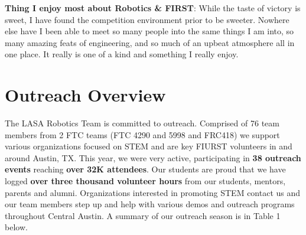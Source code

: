 {\bf Thing I enjoy most about Robotics \& FIRST}: While the taste of victory is sweet, I have found the competition environment prior to be sweeter. Nowhere else have I been able to meet so many people into the same things I am into, so many amazing feats of engineering, and so much of an upbeat atmosphere all in one place. It really is one of a kind and something I really enjoy. 

\clearpage
\newpage

\section{Outreach Overview}
The LASA Robotics Team is committed to outreach.  Comprised of 76 team members from 2 FTC teams (FTC 4290 and 5998 and FRC418) we support various organizations focused on STEM and are key FIURST volunteers in and around Austin, TX.  This year, we were very active, participating in {\bf 38 outreach events} reaching {\bf over 32K attendees}.  Our students are proud that we have logged {\bf over three thousand volunteer hours} from our students, mentors, parents and alumni.   Organizations interested in promoting STEM contact us and our team members step up and help with various demos and outreach programs throughout Central Austin.  A summary of our outreach season is in Table 1 below. \\

